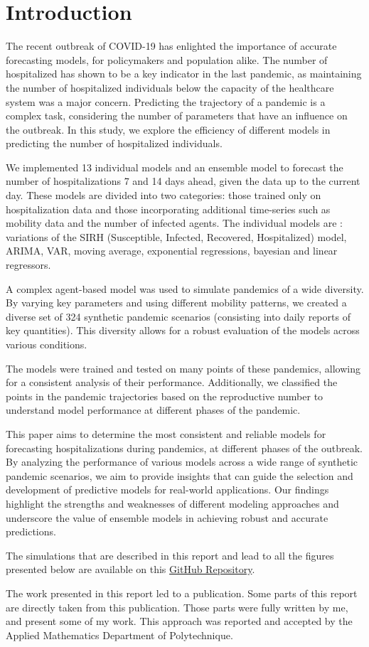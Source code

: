 \section{Introduction}

The recent outbreak of COVID-19 has enlighted the importance of accurate forecasting models, for policymakers and population alike. 
The number of hospitalized has shown to be a key indicator in the last pandemic, as maintaining the number of hospitalized individuals below the capacity of the healthcare system was a major concern.
Predicting the trajectory of a pandemic is a complex task, considering the number of parameters that have an influence on the outbreak. 
In this study, we explore the efficiency of different models in predicting the number of hospitalized individuals. 

We implemented 13 individual models and an ensemble model to forecast the number of hospitalizations 7 and 14 days ahead, given the data up to the current day.
These models are divided into two categories: those trained only on hospitalization data and those incorporating additional time-series such as mobility data and the number of infected agents. 
The individual models are : variations of the SIRH (Susceptible, Infected, Recovered, Hospitalized) model, ARIMA, VAR, moving average, exponential regressions, bayesian and linear regressors.

A complex agent-based model was used to simulate pandemics of a wide diversity. 
By varying key parameters and using different mobility patterns, we created a diverse set of 324 synthetic pandemic scenarios (consisting into daily reports of key quantities). 
This diversity allows for a robust evaluation of the models across various conditions.

The models were trained and tested on many points of these pandemics, allowing for a consistent analysis of their performance. 
Additionally, we classified the points in the pandemic trajectories based on the reproductive number to understand model performance at different phases of the pandemic.

This paper aims to determine the most consistent and reliable models for forecasting hospitalizations during pandemics, at different phases of the outbreak. 
By analyzing the performance of various models across a wide range of synthetic pandemic scenarios, we aim to provide insights that can guide the selection and development of predictive models for real-world applications. 
Our findings highlight the strengths and weaknesses of different modeling approaches and underscore the value of ensemble models in achieving robust and accurate predictions.

The simulations that are described in this report and lead to all the figures presented below are available on this  \href{https://github.com/gregoirebechade/covid_internship}{GitHub Repository}\label{github-link}.

The work presented in this report led to a publication. 
Some parts of this report are directly taken from this publication. 
Those parts were fully written by me, and present some of my work. 
This approach was reported and accepted by the Applied Mathematics Department of Polytechnique.  